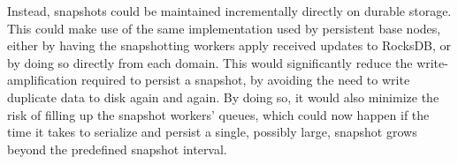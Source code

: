 Instead, snapshots could be maintained incrementally directly on durable
storage. This could make use of the same  implementation
used by persistent base nodes, either by having the snapshotting workers apply
received updates to RocksDB, or by doing so directly from each domain. This
would significantly reduce the write-amplification required to persist a
snapshot, by avoiding the need to write duplicate data to disk again and again.
By doing so, it would also minimize the risk of filling up the snapshot workers'
queues, which could now happen if the time it takes to serialize and persist a
single, possibly large, snapshot grows beyond the predefined snapshot interval.
